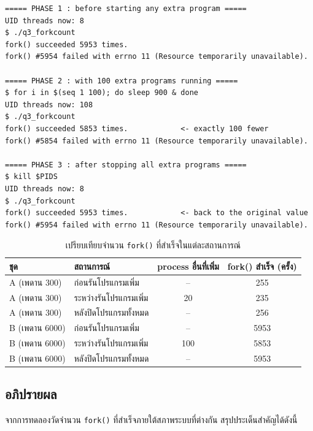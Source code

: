\documentclass[a4paper,12pt]{article}
\newcommand{\code}[1]{\texttt{#1}}
\begin{document}
\begin{lstlisting}[style=terminal,caption={ผลลัพธ์ทั้งสามเฟสของชุด B (ulimit -u 6000)}]
===== PHASE 1 : before starting any extra program =====
UID threads now: 8
$ ./q3_forkcount
fork() succeeded 5953 times.
fork() #5954 failed with errno 11 (Resource temporarily unavailable).

===== PHASE 2 : with 100 extra programs running =====
$ for i in $(seq 1 100); do sleep 900 & done
UID threads now: 108
$ ./q3_forkcount
fork() succeeded 5853 times.            <- exactly 100 fewer
fork() #5854 failed with errno 11 (Resource temporarily unavailable).

===== PHASE 3 : after stopping all extra programs =====
$ kill $PIDS
UID threads now: 8
$ ./q3_forkcount
fork() succeeded 5953 times.            <- back to the original value
fork() #5954 failed with errno 11 (Resource temporarily unavailable).
\end{lstlisting}

\begin{table}[H]
\centering
\caption{เปรียบเทียบจำนวน \code{fork()} ที่สำเร็จในแต่ละสถานการณ์}
\begin{tabular}{llcc}
\toprule
\textbf{ชุด} & \textbf{สถานการณ์} & \textbf{process อื่นที่เพิ่ม} & \textbf{fork() สำเร็จ (ครั้ง)} \\
\midrule
A (เพดาน 300)  & ก่อนรันโปรแกรมเพิ่ม   & --   & 255 \\
A (เพดาน 300)  & ระหว่างรันโปรแกรมเพิ่ม & 20   & 235 \\
A (เพดาน 300)  & หลังปิดโปรแกรมทั้งหมด  & --   & 256 \\
\midrule
B (เพดาน 6000) & ก่อนรันโปรแกรมเพิ่ม   & --   & 5953 \\
B (เพดาน 6000) & ระหว่างรันโปรแกรมเพิ่ม & 100  & 5853 \\
B (เพดาน 6000) & หลังปิดโปรแกรมทั้งหมด  & --   & 5953 \\
\bottomrule
\end{tabular}
\end{table}

\subsection{อภิปรายผล}

จากการทดลองวัดจำนวน \code{fork()} ที่สำเร็จภายใต้สภาพระบบที่ต่างกัน
สรุปประเด็นสำคัญได้ดังนี้
\end{document}
